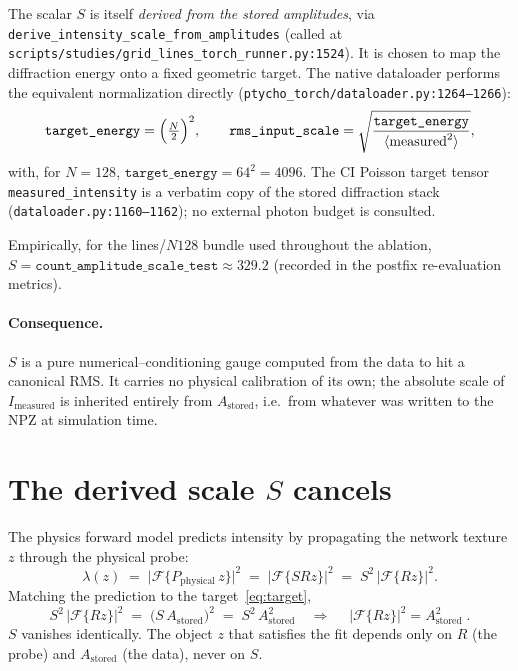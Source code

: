 \documentclass[11pt]{article}
\newcommand{\Astored}{A_{\mathrm{stored}}}
\newcommand{\Imeas}{I_{\mathrm{measured}}}
\newcommand{\Pphys}{P_{\mathrm{physical}}}
\newcommand{\code}[1]{\texttt{#1}}
\begin{document}
The scalar $S$ is itself \emph{derived from the stored amplitudes}, via
\code{derive\_intensity\_scale\_from\_amplitudes} (called at
\code{scripts/studies/grid\_lines\_torch\_runner.py:1524}). It is chosen to map
the diffraction energy onto a fixed geometric target. The native dataloader
performs the equivalent normalization directly
(\code{ptycho\_torch/dataloader.py:1264--1266}):
\begin{equation}
\code{target\_energy} = \Bigl(\tfrac{N}{2}\Bigr)^2,
\qquad
\code{rms\_input\_scale} = \sqrt{\frac{\code{target\_energy}}{\langle
\text{measured}^2\rangle}} ,
\label{eq:rms}
\end{equation}
with, for $N=128$, $\code{target\_energy} = 64^2 = 4096$. The CI Poisson target
tensor \code{measured\_intensity} is a verbatim copy of the stored diffraction
stack (\code{dataloader.py:1160--1162}); no external photon budget is consulted.

Empirically, for the lines/$N128$ bundle used throughout the ablation,
$S = \code{count\_amplitude\_scale\_test} \approx 329.2$
(recorded in the postfix re-evaluation metrics).

\paragraph{Consequence.} $S$ is a pure numerical--conditioning gauge computed
from the data to hit a canonical RMS. It carries no physical calibration of its
own; the absolute scale of $\Imeas$ is inherited entirely from $\Astored$,
i.e.\ from whatever was written to the NPZ at simulation time.

\section{The derived scale $S$ cancels}

The physics forward model predicts intensity by propagating the network texture
$z$ through the physical probe:
\begin{equation}
\lambda(z) \;=\; \bigl|\mathcal{F}\{\Pphys\, z\}\bigr|^2
\;=\; \bigl|\mathcal{F}\{S R z\}\bigr|^2
\;=\; S^2\,\bigl|\mathcal{F}\{R z\}\bigr|^2 .
\end{equation}
Matching the prediction to the target~\eqref{eq:target},
\begin{equation}
S^2\,\bigl|\mathcal{F}\{R z\}\bigr|^2
\;=\; \bigl(S\,\Astored\bigr)^2
\;=\; S^2\,\Astored^2
\quad\Longrightarrow\quad
\boxed{\;\bigl|\mathcal{F}\{R z\}\bigr|^2 = \Astored^2\;}.
\label{eq:cancel}
\end{equation}
$S$ vanishes identically. The object $z$ that satisfies the fit depends only on
$R$ (the probe) and $\Astored$ (the data), never on $S$.
\end{document}
